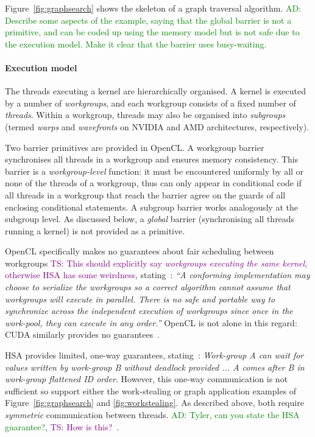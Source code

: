 \documentclass[nocopyrightspace,10pt]{sigplanconf}
\newcommand{\ADComment}[1]{\textcolor{green}{AD: #1}}
\newcommand{\TSComment}[1]{\textcolor{purple}{TS: #1}}
\begin{document}
Figure~\ref{fig:graphsearch} shows the
skeleton of a graph traversal algorithm.  \ADComment{Describe some
  aspects of the example, saying that the global barrier is not a
  primitive, and can be coded up using the memory model but is not
  safe due to the execution model.  Make it clear that the barrier uses busy-waiting.}

\paragraph{Execution model}

The threads executing a kernel are hierarchically organised.  A kernel
is executed by a number of \emph{workgroups}, and each workgroup
consists of a fixed number of \emph{threads}.  Within a workgroup,
threads may also be organised into \emph{subgroups} (termed
\emph{warps} and \emph{wavefronts} on NVIDIA and AMD architectures,
respectively).

Two barrier primitives are provided in OpenCL.  A workgroup barrier
synchronises all threads in a workgroup and ensures memory
consistency.  This barrier is a \emph{workgroup-level} function: it
must be encountered uniformly by all or none of the threads of a
workgroup, thus can only appear in conditional code if all threads in
a workgroup that reach the barrier agree on the guards of all
enclosing conditional statements.  A subgroup barrier works
analogously at the subgroup level.  As discussed below, a
\emph{global} barrier (synchronising all threads running a kernel) is
not provided as a primitive.

OpenCL specifically makes no guarantees about fair scheduling between
workgroups \TSComment{This should explicitly say \emph{workgroups
    executing the same kernel}, otherwise HSA has some weirdness},
stating~\cite{...}: \emph{``A conforming implementation may choose to
  serialize the workgroups so a correct algorithm cannot assume that
  workgroups will execute in parallel.  There is no safe and portable
  way to synchronize across the independent execution of workgroups
  since once in the work-pool, they can execute in any order.''}
OpenCL is not alone in this regard: CUDA similarly provides no
guarantees~\cite{...}. 

HSA provides limited, one-way guarantees,
stating~\cite[p. 46]{HSAprogramming11}: \emph{Work-group A can wait
  for values written by work-group B without deadlock provided ... A
  comes after B in work-group flattened ID order}. However, this
one-way communication is not sufficient so support either the
work-stealing or graph application examples of
Figure~\ref{fig:graphsearch} and \ref{fig:workstealing}. As described
above, both require \emph{symmetric} communication between
threads. \ADComment{Tyler, can you state the HSA guarantee?},
\TSComment{How is this?}~\cite{...}.
\end{document}
